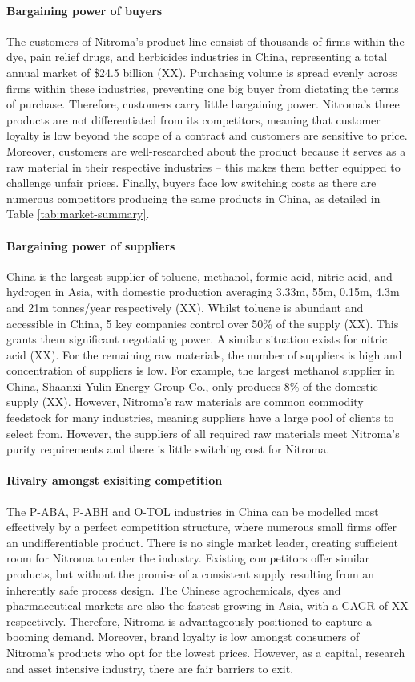 \paragraph{Bargaining power of buyers}
The customers of Nitroma’s product line consist of thousands of firms within the dye, pain relief drugs, and herbicides industries in China, representing a total annual market of \$24.5 billion (XX). Purchasing volume is spread evenly across firms within these industries, preventing one big buyer from dictating the terms of purchase. Therefore, customers carry little bargaining power. Nitroma’s three products are not differentiated from its competitors, meaning that customer loyalty is low beyond the scope of a contract and customers are sensitive to price. Moreover, customers are well-researched about the product because it serves as a raw material in their respective industries – this makes them better equipped to challenge unfair prices. Finally, buyers face low switching costs as there are numerous competitors producing the same products in China, as detailed in Table \ref{tab:market-summary}.

\paragraph{Bargaining power of suppliers}
China is the largest supplier of toluene, methanol, formic acid, nitric acid, and hydrogen in Asia, with domestic production averaging 3.33m, 55m, 0.15m, 4.3m and 21m tonnes/year respectively (XX). Whilst toluene is abundant and accessible in China, 5 key companies control over 50\% of the supply (XX). This grants them significant negotiating power. A similar situation exists for nitric acid (XX). For the remaining raw materials, the number of suppliers is high and concentration of suppliers is low. For example, the largest methanol supplier in China, Shaanxi Yulin Energy Group Co., only produces 8\% of the domestic supply (XX). However, Nitroma’s raw materials are common commodity feedstock for many industries, meaning suppliers have a large pool of clients to select from. However, the suppliers of all required raw materials meet Nitroma’s purity requirements and there is little switching cost for Nitroma. 

\paragraph{Rivalry amongst exisiting competition}
The P-ABA, P-ABH and O-TOL industries in China can be modelled most effectively by a perfect competition structure, where numerous small firms offer an undifferentiable product. There is no single market leader, creating sufficient room for Nitroma to enter the industry. Existing competitors offer similar products, but without the promise of a consistent supply resulting from an inherently safe process design. The Chinese agrochemicals, dyes and pharmaceutical markets are also the fastest growing in Asia, with a CAGR of XX respectively. Therefore, Nitroma is advantageously positioned to capture a booming demand. Moreover, brand loyalty is low amongst consumers of Nitroma’s products who opt for the lowest prices. However, as a capital, research and asset intensive industry, there are fair barriers to exit. 

